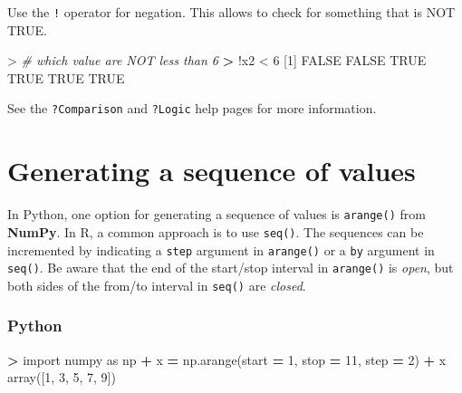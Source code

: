 \documentclass[
]{book}
\newenvironment{Shaded}{\begin{snugshade}}{\end{snugshade}}
\newcommand{\CommentTok}[1]{\textcolor[rgb]{0.56,0.35,0.01}{\textit{#1}}}
\newcommand{\ConstantTok}[1]{\textcolor[rgb]{0.00,0.00,0.00}{#1}}
\newcommand{\DecValTok}[1]{\textcolor[rgb]{0.00,0.00,0.81}{#1}}
\newcommand{\ErrorTok}[1]{\textcolor[rgb]{0.64,0.00,0.00}{\textbf{#1}}}
\newcommand{\ImportTok}[1]{#1}
\newcommand{\NormalTok}[1]{#1}
\newcommand{\OperatorTok}[1]{\textcolor[rgb]{0.81,0.36,0.00}{\textbf{#1}}}
\newcommand{\SpecialCharTok}[1]{\textcolor[rgb]{0.00,0.00,0.00}{#1}}
\begin{document}
Use the \texttt{!} operator for negation. This allows to check for something that is NOT TRUE.

\begin{Shaded}
\begin{Highlighting}[]
\SpecialCharTok{\textgreater{}} \CommentTok{\# which value are NOT less than 6}
\ErrorTok{\textgreater{}} \SpecialCharTok{!}\NormalTok{x2 }\SpecialCharTok{\textless{}} \DecValTok{6}
\NormalTok{[}\DecValTok{1}\NormalTok{] }\ConstantTok{FALSE} \ConstantTok{FALSE}  \ConstantTok{TRUE}  \ConstantTok{TRUE}  \ConstantTok{TRUE}  \ConstantTok{TRUE}
\end{Highlighting}
\end{Shaded}

See the \texttt{?Comparison} and \texttt{?Logic} help pages for more information.

\hypertarget{generating-a-sequence-of-values}{%
\section{Generating a sequence of values}\label{generating-a-sequence-of-values}}

In Python, one option for generating a sequence of values is \texttt{arange()} from \textbf{NumPy}. In R, a common approach is to use \texttt{seq()}. The sequences can be incremented by indicating a \texttt{step} argument in \texttt{arange()} or a \texttt{by} argument in \texttt{seq()}. Be aware that the end of the start/stop interval in \texttt{arange()} is \emph{open}, but both sides of the from/to interval in \texttt{seq()} are \emph{closed}.

\hypertarget{python-5}{%
\subsubsection*{Python}\label{python-5}}

\begin{Shaded}
\begin{Highlighting}[]
\OperatorTok{\textgreater{}} \ImportTok{import}\NormalTok{ numpy }\ImportTok{as}\NormalTok{ np}
\OperatorTok{+}\NormalTok{ x }\OperatorTok{=}\NormalTok{ np.arange(start }\OperatorTok{=} \DecValTok{1}\NormalTok{, stop }\OperatorTok{=} \DecValTok{11}\NormalTok{, step }\OperatorTok{=} \DecValTok{2}\NormalTok{)}
\OperatorTok{+}\NormalTok{ x}
\NormalTok{array([}\DecValTok{1}\NormalTok{, }\DecValTok{3}\NormalTok{, }\DecValTok{5}\NormalTok{, }\DecValTok{7}\NormalTok{, }\DecValTok{9}\NormalTok{])}
\end{Highlighting}
\end{Shaded}
\end{document}
